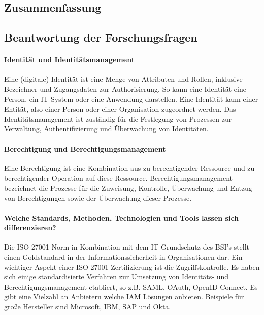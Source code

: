 \documentclass[11pt]{article}
\begin{document}
\subsection{Zusammenfassung}
\subsection{Beantwortung der Forschungsfragen}
\paragraph{Identität und Identitätsmanagement}
Eine (digitale) Identität ist eine Menge von Attributen und Rollen, inklusive Bezeichner und Zugangsdaten zur Authorisierung. So kann eine Identität eine Person, ein IT-System oder eine Anwendung darstellen. Eine Identität kann einer Entität, also einer Person oder einer Organisation zugeordnet werden. Das Identitätsmanagement ist zuständig für die Festlegung von Prozessen zur Verwaltung, Authentifizierung und Überwachung von Identitäten.
\paragraph{Berechtigung und Berechtigungsmanagement}
Eine Berechtigung ist eine Kombination aus zu berechtigender Ressource und zu berechtigender Operation auf diese Ressource. Berechtigungsmanagement bezeichnet die Prozesse für die Zuweisung, Kontrolle, Überwachung und Entzug von Berechtigungen sowie der Überwachung dieser Prozesse.
\paragraph{Welche Standards, Methoden, Technologien und Tools lassen sich differenzieren?}
Die ISO 27001 Norm in Kombination mit dem IT-Grundschutz des BSI's stellt einen Goldstandard in der Informationssicherheit in Organisationen dar. Ein wichtiger Aspekt einer ISO 27001 Zertifizierung ist die Zugriffskontrolle.  Es haben sich einige standardisierte Verfahren zur Umsetzung von Identitäts- und Berechtigungsmanagement etabliert, so z.B. SAML, OAuth, OpenID Connect. Es gibt eine Vielzahl an Anbietern welche IAM Lösungen anbieten. Beispiele für große Hersteller sind Microsoft, IBM, SAP und Okta.
\end{document}
